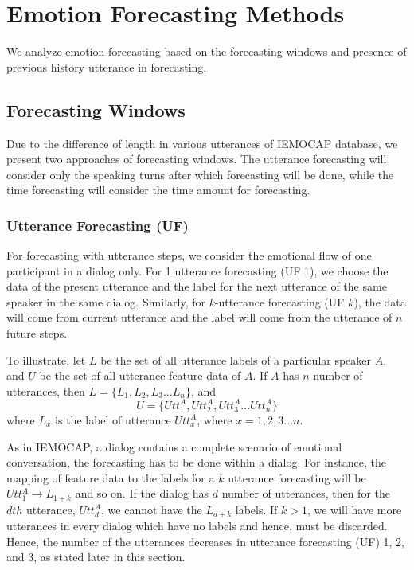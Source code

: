 \section{Emotion Forecasting Methods}
We analyze emotion forecasting based on the forecasting windows and presence of previous history utterance in forecasting.
\subsection{Forecasting Windows}
Due to the difference of length in various utterances of IEMOCAP database, we present two approaches of forecasting windows. The utterance forecasting will consider only the speaking turns after which forecasting will be done, while the time forecasting will consider the time amount for forecasting.
\subsubsection{Utterance Forecasting (UF)}
\label{utt_steps}
For forecasting with utterance steps, we consider the emotional flow of one participant in a dialog only. For 1 utterance forecasting (UF 1), we choose the data of the present utterance and the label for the next utterance of the same speaker in the same dialog. Similarly, for $k$-utterance forecasting (UF $k$), the data will come from current utterance and the label will come from the utterance of $n$ future steps.  

To illustrate, let $L$ be the set of all utterance labels of a particular speaker $A$, and $U$ be the set of all utterance feature data of $A$. If $A$ has $n$ number of utterances, then
$L=\{L_1,L_2,L_3...L_n\}$, 
and
\[
U=\{Utt_{1}^A, Utt_{2}^A, Utt_{3}^A...Utt_{n}^A\}
\]
 where $L_x$ is the label of  utterance $Utt_{x}^A$, where $x=1,2,3...n$.

 As in IEMOCAP, a dialog contains a complete scenario of emotional conversation, the forecasting has to be done within a dialog.    For instance,  the mapping of feature data  to the labels for a $k$ utterance forecasting will be $Utt_{1}^A \rightarrow L_{1+k}$ and so on. If the dialog has $d$ number of utterances, then for the $dth$ utterance, $Utt_{d}^A$, we cannot have the $L_{d+k}$ labels. If $k>1$, we will have more utterances in every dialog which have no labels and  hence, must be discarded. Hence, the number of the utterances decreases in utterance forecasting (UF) 1, 2, and 3, as stated later in this section. 

